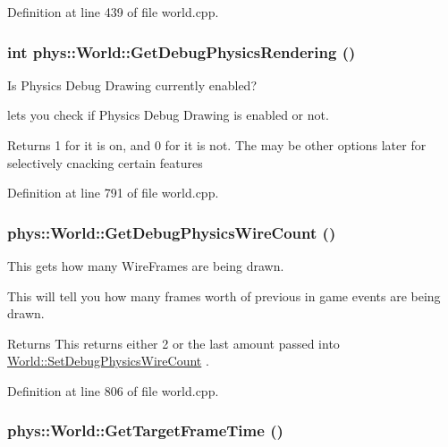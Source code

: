 Definition at line 439 of file world.cpp.

\hypertarget{classphys_1_1World_a92070d16eb81866b4393f0ed96fbcbbc}{
\subsubsection[{GetDebugPhysicsRendering}]{\setlength{\rightskip}{0pt plus 5cm}int phys::World::GetDebugPhysicsRendering ()}}
\label{da/ddf/classphys_1_1World_a92070d16eb81866b4393f0ed96fbcbbc}


Is Physics Debug Drawing currently enabled? 

lets you check if Physics Debug Drawing is enabled or not. \begin{DoxyReturn}{Returns}
1 for it is on, and 0 for it is not. The may be other options later for selectively cnacking certain features 
\end{DoxyReturn}


Definition at line 791 of file world.cpp.

\hypertarget{classphys_1_1World_a1031d596580ac1a8d3593b5be9b49091}{
\subsubsection[{GetDebugPhysicsWireCount}]{ phys::World::GetDebugPhysicsWireCount ()}}
\label{da/ddf/classphys_1_1World_a1031d596580ac1a8d3593b5be9b49091}


This gets how many WireFrames are being drawn. 

This will tell you how many frames worth of previous in game events are being drawn. \begin{DoxyReturn}{Returns}
This returns either 2 or the last amount passed into \hyperlink{classphys_1_1World_a6fa4d1e58a78ba0403af1c003fd321d9}{World::SetDebugPhysicsWireCount} . 
\end{DoxyReturn}


Definition at line 806 of file world.cpp.

\hypertarget{classphys_1_1World_aa063ace52be484c7b03ec5859453f48b}{
\subsubsection[{GetTargetFrameTime}]{ phys::World::GetTargetFrameTime ()}}
\label{da/ddf/classphys_1_1World_aa063ace52be484c7b03ec5859453f48b}


